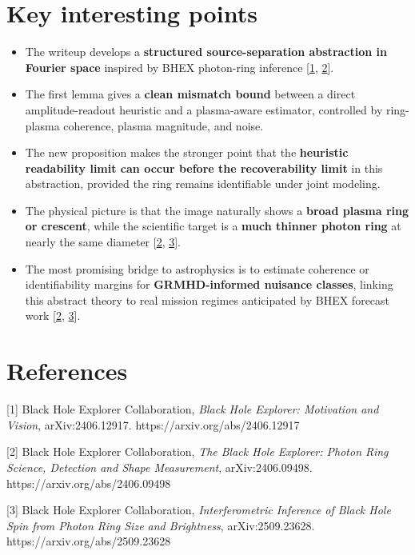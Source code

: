 \documentclass[10pt,letterpaper,twocolumn]{article}
\providecommand{\tightlist}{%
  \setlength{\itemsep}{0pt}\setlength{\parskip}{0pt}}
\begin{document}
\hypertarget{key-interesting-points}{%
\section{Key interesting points}\label{key-interesting-points}}

\begin{itemize}
\tightlist
\item
  The writeup develops a
  \textbf{structured source-separation abstraction in Fourier space}
  inspired by BHEX photon-ring inference [\hyperlink{ref-1}{1}, \hyperlink{ref-2}{2}].
\item
  The first lemma gives a \textbf{clean mismatch bound} between a direct
  amplitude-readout heuristic and a plasma-aware estimator, controlled
  by ring-plasma coherence, plasma magnitude, and noise.
\item
  The new proposition makes the stronger point that the
  \textbf{heuristic readability limit can occur before the
  recoverability limit} in this abstraction, provided the ring remains identifiable under
  joint modeling.
\item
  The physical picture is that the image naturally shows a \textbf{broad
  plasma ring or crescent}, while the scientific target is a
  \textbf{much thinner photon ring} at nearly the same diameter
  [\hyperlink{ref-2}{2}, \hyperlink{ref-3}{3}].
\item
  The most promising bridge to astrophysics is to estimate coherence or
  identifiability margins for \textbf{GRMHD-informed nuisance classes},
  linking this abstract theory to real mission regimes anticipated by
  BHEX forecast work [\hyperlink{ref-2}{2}, \hyperlink{ref-3}{3}].
\end{itemize}

\hypertarget{references}{%
\section*{References}\label{references}}

\noindent{}\hypertarget{ref-1}{}{[}1{]} Black Hole Explorer
Collaboration, \emph{Black Hole Explorer: Motivation and Vision},
arXiv:2406.12917. https://arxiv.org/abs/2406.12917

\noindent{}\hypertarget{ref-2}{}{[}2{]} Black Hole Explorer
Collaboration, \emph{The Black Hole Explorer: Photon Ring Science, Detection and Shape Measurement}, arXiv:2406.09498. https://arxiv.org/abs/2406.09498

\noindent{}\hypertarget{ref-3}{}{[}3{]} Black Hole Explorer
Collaboration, \emph{Interferometric Inference of Black Hole Spin from
Photon Ring Size and Brightness}, arXiv:2509.23628.
https://arxiv.org/abs/2509.23628
\end{document}
